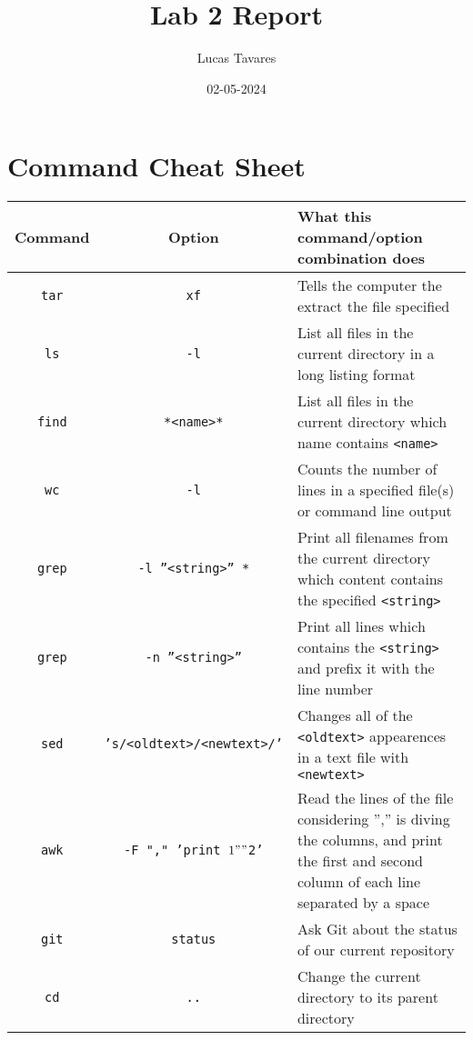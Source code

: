 \documentclass{article}
\title{Lab 2 Report}
\date{02-05-2024}
\author{Lucas Tavares}
\begin{document}
\maketitle

\newpage

\section{Command Cheat Sheet}

\begin{adjustbox}{max width=\textwidth}
\begin{tabular}{|c|c|p{4.2in}|}
\hline
Command & Option & What this command/option combination does \\
\hline
\hline
\texttt{tar} & \texttt{xf} & Tells the computer the extract the file specified \\
\hline
\texttt{ls} & \texttt{-l} & List all files in the current directory in a long listing format \\
\hline
\texttt{find} & \texttt{*<name>*} & List all files in the current directory which name contains \texttt{<name>} \\
\hline
\texttt{wc} & \texttt{-l} & Counts the number of lines in a specified file(s) or command line output \\
\hline
\texttt{grep} & \texttt{-l ''<string>'' *} & Print all filenames from the current directory which content contains the specified \texttt{<string>} \\
\hline
\texttt{grep} & \texttt{-n ''<string>''} & Print all lines which contains the \texttt{<string>} and prefix it with the line number \\
\hline
\texttt{sed} & \texttt{'s/<oldtext>/<newtext>/'} & Changes all of the \texttt{<oldtext>} appearences in a text file with \texttt{<newtext>} \\
\hline
\texttt{awk} & \texttt{-F "," '{print $1 " " $2}'} & Read the lines of the file considering '','' is diving the columns, and print the first and second column of each line separated by a space \\
\hline
\texttt{git} & \texttt{status} & Ask Git about the status of our current repository \\
\hline
\texttt{cd} & \texttt{..} & Change the current directory to its parent directory \\
\hline
\end{tabular}
\end{adjustbox}

\newpage
\end{document}
